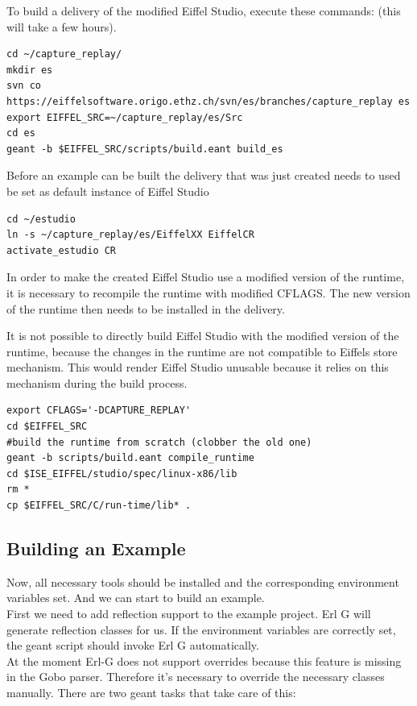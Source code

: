 To build a delivery of the modified Eiffel Studio, execute these commands: (this will take a few hours).
\begin{lstlisting}
cd ~/capture_replay/
mkdir es
svn co https://eiffelsoftware.origo.ethz.ch/svn/es/branches/capture_replay es
export EIFFEL_SRC=~/capture_replay/es/Src
cd es
geant -b $EIFFEL_SRC/scripts/build.eant build_es
\end{lstlisting}

Before an example can be built the delivery that was just created needs to used be set as default instance of Eiffel Studio
\begin{lstlisting}
cd ~/estudio
ln -s ~/capture_replay/es/EiffelXX EiffelCR
activate_estudio CR
\end{lstlisting}

In order to make the created Eiffel Studio use a modified version of the runtime, it is necessary to recompile the runtime with modified CFLAGS. The new version of the runtime then needs to be installed in the delivery.

It is not possible to directly build Eiffel Studio with the modified version of the runtime, because the changes in the runtime are not compatible to Eiffels store mechanism. This would render Eiffel Studio unusable because it relies on this mechanism during the build process.
\begin{lstlisting}
export CFLAGS='-DCAPTURE_REPLAY' 
cd $EIFFEL_SRC
#build the runtime from scratch (clobber the old one)
geant -b scripts/build.eant compile_runtime
cd $ISE_EIFFEL/studio/spec/linux-x86/lib
rm *
cp $EIFFEL_SRC/C/run-time/lib* .
\end{lstlisting}


\subsection{Building an Example}
Now, all necessary tools should be installed and the corresponding environment variables set. And we can start to build an example.\\
First we need to add reflection support to the example project. Erl G will generate reflection classes for us. If the environment variables are correctly set, the geant script should invoke Erl G automatically. \\
At the moment Erl-G does not support overrides because this feature is missing in the Gobo parser. Therefore it's necessary to override the necessary classes manually. There are two geant tasks that take care of this:

